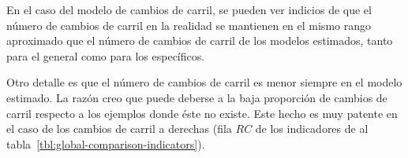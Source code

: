 En el caso del modelo de cambios de carril, se pueden ver indicios de que el número de cambios de carril en la realidad se mantienen en el mismo rango aproximado que el número de cambios de carril de los modelos estimados, tanto para el general como para los específicos.

Otro detalle es que el número de cambios de carril es menor siempre en el modelo estimado. La razón creo que puede deberse a la baja proporción de cambios de carril respecto a los ejemplos donde éste no existe. Este hecho es muy patente en el caso de los cambios de carril a derechas (fila $RC$ de los indicadores de al tabla~\ref{tbl:global-comparison-indicators}).